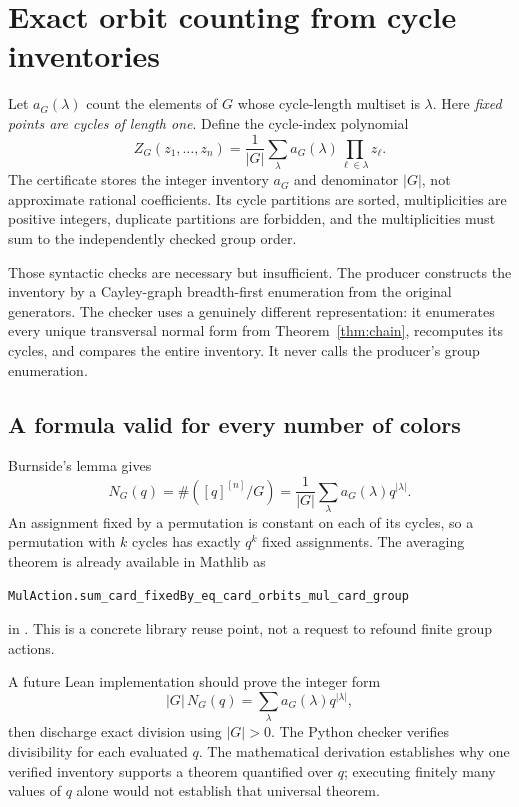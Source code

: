 \section{Exact orbit counting from cycle inventories}
\label{sec:counting}
Let $a_G(\lambda)$ count the elements of $G$ whose cycle-length multiset is $\lambda$. Here \emph{fixed points are cycles of length one}. Define the cycle-index polynomial
\[
  Z_G(z_1,\ldots,z_n)=\frac1{|G|}
  \sum_{\lambda} a_G(\lambda)\prod_{\ell\in\lambda}z_\ell.
\]
The certificate stores the integer inventory $a_G$ and denominator $|G|$, not approximate rational coefficients. Its cycle partitions are sorted, multiplicities are positive integers, duplicate partitions are forbidden, and the multiplicities must sum to the independently checked group order.

Those syntactic checks are necessary but insufficient. The producer constructs the inventory by a Cayley-graph breadth-first enumeration from the original generators. The checker uses a genuinely different representation: it enumerates every unique transversal normal form from Theorem~\ref{thm:chain}, recomputes its cycles, and compares the entire inventory. It never calls the producer's group enumeration.

\subsection{A formula valid for every number of colors}
Burnside's lemma gives
\begin{equation}
  N_G(q)=\#([q]^{[n]}/G)
  =\frac1{|G|}\sum_{\lambda}a_G(\lambda)q^{|\lambda|}.
  \label{eq:burnside}
\end{equation}
An assignment fixed by a permutation is constant on each of its cycles, so a permutation with $k$ cycles has exactly $q^k$ fixed assignments. The averaging theorem is already available in Mathlib as
\begin{lstlisting}
MulAction.sum_card_fixedBy_eq_card_orbits_mul_card_group
\end{lstlisting}
in  \cite{mathlib-burnside}. This is a concrete library reuse point, not a request to refound finite group actions.

A future Lean implementation should prove the integer form
\[
 |G|\,N_G(q)=\sum_{\lambda}a_G(\lambda)q^{|\lambda|},
\]
then discharge exact division using $|G|>0$. The Python checker verifies divisibility for each evaluated $q$. The mathematical derivation establishes why one verified inventory supports a theorem quantified over $q$; executing finitely many values of $q$ alone would not establish that universal theorem.

